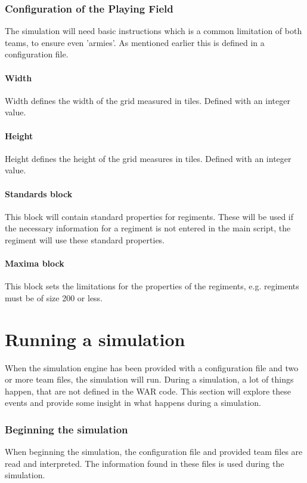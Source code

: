 		\subsubsection{Configuration of the Playing Field}
		The simulation will need basic instructions which is a common limitation of both teams, to ensure even 'armies'. 
		As mentioned earlier this is defined in a configuration file.
		
		\paragraph{Width}
		Width defines the width of the grid measured in tiles.
		Defined with an integer value.
		
		\paragraph{Height}
		Height defines the height of the grid measures in tiles.
		Defined with an integer value.
		
		\paragraph{Standards block}
		This block will contain standard properties for regiments. These will be used if the necessary 
		information for a regiment is not entered in the main script, the regiment will use these standard properties.
		
		\paragraph{Maxima block}
		This block sets the limitations for the properties of the regiments, e.g. regiments must be of size 200 or less.

\section{Running a simulation}
	When the simulation engine has been provided with a configuration file and two or more team files, the simulation will run. During a simulation, a lot of things happen, that are not defined in the WAR code. This section will explore these events and provide some insight in what happens during a simulation.
	
		\subsubsection{Beginning the simulation}
		When beginning the simulation, the configuration file and provided team files are read and interpreted. The information found in these files is used during the simulation. 
		
